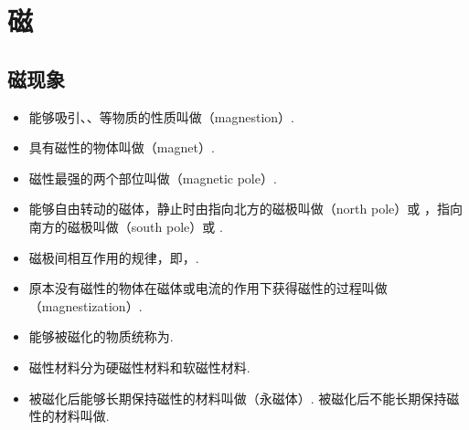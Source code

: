 \section{磁}

\subsection{磁现象}
\begin{itemize}
\item 能够吸引、、等物质的性质叫做（magnestion）.
\item 具有磁性的物体叫做（magnet）.
\item 磁性最强的两个部位叫做（magnetic pole）.
\item 能够自由转动的磁体，静止时由指向北方的磁极叫做（north pole）或 ，指向南方的磁极叫做（south pole）或 .
\item 磁极间相互作用的规律，即，.
\item 原本没有磁性的物体在磁体或电流的作用下获得磁性的过程叫做（magnestization）.
\item 能够被磁化的物质统称为.
\item 磁性材料分为硬磁性材料和软磁性材料.
\item 被磁化后能够长期保持磁性的材料叫做（永磁体）. 被磁化后不能长期保持磁性的材料叫做.
\end{itemize}